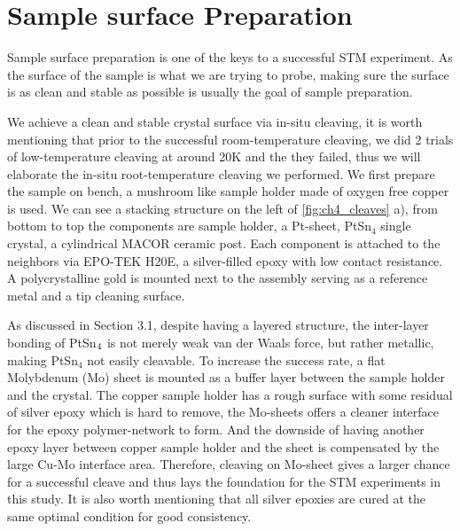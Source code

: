 \section{Sample surface Preparation}
\par Sample surface preparation is one of the keys to a successful STM experiment. As the surface of the sample is what we are trying to probe, making sure the surface is as clean and stable as possible is usually the goal of sample preparation. 

\par We achieve a clean and stable crystal surface via in-situ cleaving, it is worth mentioning that prior to the successful room-temperature cleaving, we did 2 trials of low-temperature cleaving at around 20K and the they failed, thus we will elaborate the in-situ root-temperature cleaving we performed. We first prepare the sample on bench, a mushroom like sample holder made of oxygen free copper is used. We can see a stacking structure on the left of \ref{fig:ch4_cleaves} a), from bottom to top the components are sample holder, a Pt-sheet, PtSn$_4$ single crystal, a cylindrical MACOR ceramic post. Each component is attached to the neighbors via EPO-TEK H20E, a silver-filled epoxy with low contact resistance. A polycrystalline gold is mounted next to the assembly serving as a reference metal and a tip cleaning surface. 

\par As discussed in Section 3.1, despite having a layered structure, the inter-layer bonding of PtSn$\textsubscript{4}$ is not merely weak van der Waals force, but rather metallic, making PtSn$_4$ not easily cleavable. To increase the success rate, a flat Molybdenum (Mo) sheet is mounted as a buffer layer between the sample holder and the crystal. The copper sample holder has a rough surface with some residual of silver epoxy which is hard to remove, the Mo-sheets offers a cleaner interface for the epoxy polymer-network to form. And the downside of having another epoxy layer between copper sample holder and the sheet is compensated by the large Cu-Mo interface area. Therefore, cleaving on Mo-sheet gives a larger chance for a successful cleave and thus lays the foundation for the \ac{STM} experiments in this study. It is also worth mentioning that all silver epoxies are cured at the same optimal condition for good consistency. 

